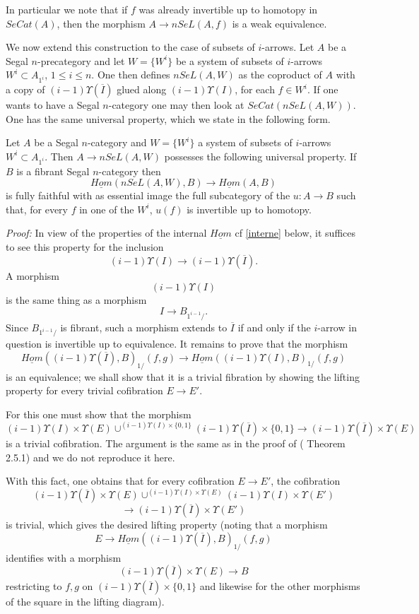 In particular we note that if $f$ was already invertible up to
homotopy in $SeCat(A)$, then the morphism
$A\rightarrow nSeL(A, f)$ is a weak equivalence.

We now extend this construction to the case of
subsets of $i$-arrows. Let $A$ be a Segal
$n$-precategory and let $W=\{ W^i \}$ be a system of subsets of $i$-arrows
$W^i\subset A_{1^i}$, $1\leq i \leq n$. One then defines $nSeL(A,
W)$ as the coproduct of $A$ with a copy of $(i-1)\Upsilon
(\overline{I})$ glued along $(i-1)\Upsilon (I)$, for each $f\in
W^i$. If one wants to have a Segal $n$-category one may then look
at $SeCat(nSeL(A, W))$. One has the same universal property, which we
state in the following form.

\begin{proposition}
\label{propuniSeL}
Let $A$ be a Segal $n$-category and
$W=\{ W^i \}$ a system of subsets of $i$-arrows
$W^i\subset A_{1^i}$. Then $A\rightarrow nSeL(A, W)$ possesses the
following universal
property. If $B$ is a
fibrant Segal $n$-category then
$$
\underline{Hom}(nSeL(A, W), B)\rightarrow \underline{Hom}(A, B)
$$
is fully faithful with as essential image
the full subcategory of the $u: A\rightarrow B$ such that, for every
$f$ in one of the $W^i$,
$u(f)$ is invertible
up to homotopy.
\end{proposition}
{\em Proof:}
In view of the properties of the internal $\underline{Hom}$ cf \ref{interne}
below, it suffices to see this property for the inclusion
$$
(i-1)\Upsilon (I) \rightarrow (i-1)\Upsilon (\overline{I}).
$$
A morphism
$$
(i-1)\Upsilon (I)
$$
is the same thing as a morphism
$$
I\rightarrow B_{1^{i-1}/}.
$$
Since $B_{1^{i-1}/}$ is fibrant, such a morphism extends to $\overline{I}$
if and only if the $i$-arrow in question is invertible up to
equivalence. It remains to prove that the morphism
$$
\underline{Hom}((i-1)\Upsilon (\overline{I}),B)_{1/}(f,g)
\rightarrow
\underline{Hom}((i-1)\Upsilon (I),B)_{1/}(f,g)
$$
is an equivalence; we shall show that it is a trivial fibration by
showing the
lifting property for every trivial cofibration
$E\rightarrow E'$.

For this one must show that the morphism
$$
(i-1)\Upsilon (I) \times \Upsilon (E) \cup ^{
(i-1)\Upsilon (I)\times \{ 0,1\}}
(i-1)\Upsilon (\overline{I})\times \{ 0,1\}
\rightarrow
(i-1)\Upsilon (\overline{I})\times \Upsilon (E)
$$
is a trivial cofibration. The argument is the same as in the
proof of (\cite{limits} Theorem 2.5.1) and we do not reproduce it here.

With this fact, one obtains that for every cofibration $E\rightarrow E'$,
the cofibration
$$
(i-1)\Upsilon (\overline{I})\times \Upsilon (E) \cup ^{
(i-1)\Upsilon (I)\times \Upsilon (E)}
(i-1)\Upsilon (I)\times \Upsilon (E')
$$
$$
\rightarrow (i-1)\Upsilon (\overline{I})\times \Upsilon (E')
$$
is trivial, which gives the desired lifting property
(noting that a morphism
$$
E\rightarrow \underline{Hom}((i-1)\Upsilon (\overline{I}),B)_{1/}(f,g)
$$
identifies with a morphism
$$
(i-1)\Upsilon (\overline{I})\times \Upsilon (E)\rightarrow B
$$
restricting to $f,g$ on $(i-1)\Upsilon (\overline{I})\times \{ 0,1\}$
and likewise for the other morphisms of the square in the lifting
diagram).
\eop


